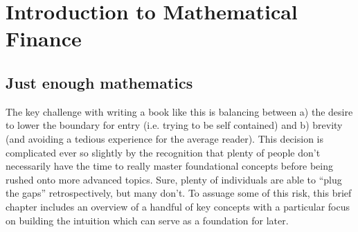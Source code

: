 \documentclass[../../Axiomathic.tex]{subfiles}
\begin{document}

\chapter{Introduction to Mathematical Finance}

\section{Just enough mathematics}
The key challenge with writing a book like this is balancing between a) the desire to lower the boundary for entry (i.e. trying to be self contained) and b) brevity (and avoiding a tedious experience for the average reader). This decision is complicated ever so slightly by the recognition that plenty of people don't necessarily have the time to really master foundational concepts before being rushed onto more advanced topics. Sure, plenty of individuals are able to ``plug the gaps'' retrospectively, but many don't. To assuage some of this risk, this brief chapter includes an overview of a handful of key concepts with a particular focus on building the intuition which can serve as a foundation for later. 
\end{document}
